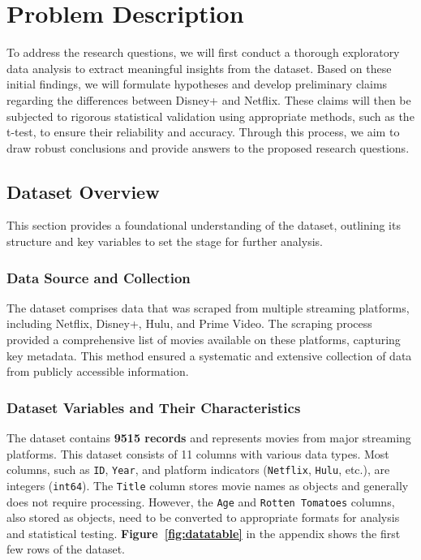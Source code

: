 \section{Problem Description}

To address the research questions, we will first conduct a thorough exploratory data analysis to extract meaningful insights from the dataset. Based on these initial findings, we will formulate hypotheses and develop preliminary claims regarding the differences between Disney+ and Netflix. These claims will then be subjected to rigorous statistical validation using appropriate methods, such as the t-test, to ensure their reliability and accuracy. Through this process, we aim to draw robust conclusions and provide answers to the proposed research questions.

\subsection{Dataset Overview}

This section provides a foundational understanding of the dataset, outlining its structure and key variables to set the stage for further analysis.

\subsubsection{Data Source and Collection}

The dataset comprises data that was scraped from multiple streaming platforms, including Netflix, Disney+, Hulu, and Prime Video. The scraping process provided a comprehensive list of movies available on these platforms, capturing key metadata. This method ensured a systematic and extensive collection of data from publicly accessible information.

\subsubsection{Dataset Variables and Their Characteristics}

The dataset contains \textbf{9515 records} and represents movies from major streaming platforms. This dataset consists of 11 columns with various data types. Most columns, such as \texttt{ID}, \texttt{Year}, and platform indicators (\texttt{Netflix}, \texttt{Hulu}, etc.), are integers (\texttt{int64}). The \texttt{Title} column stores movie names as objects and generally does not require processing. However, the \texttt{Age} and \texttt{Rotten Tomatoes} columns, also stored as objects, need to be converted to appropriate formats for analysis and statistical testing. \textbf{Figure~\ref{fig:datatable}} in the appendix shows the first few rows of the dataset.

